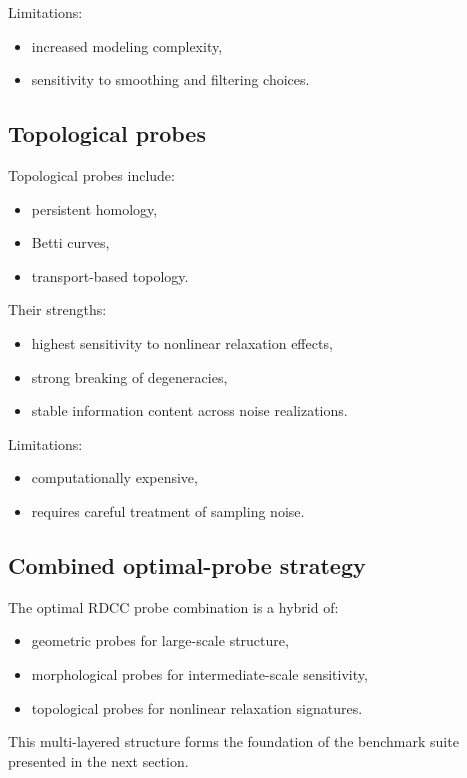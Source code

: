 \documentclass[11pt,a4paper]{article}
\begin{document}
Limitations:
\begin{itemize}
    \item increased modeling complexity,
    \item sensitivity to smoothing and filtering choices.
\end{itemize}

\subsection{Topological probes}

Topological probes include:
\begin{itemize}
    \item persistent homology,
    \item Betti curves,
    \item transport-based topology.
\end{itemize}

Their strengths:
\begin{itemize}
    \item highest sensitivity to nonlinear relaxation effects,
    \item strong breaking of degeneracies,
    \item stable information content across noise realizations.
\end{itemize}

Limitations:
\begin{itemize}
    \item computationally expensive,
    \item requires careful treatment of sampling noise.
\end{itemize}

\subsection{Combined optimal-probe strategy}

The optimal RDCC probe combination is a hybrid of:
\begin{itemize}
    \item geometric probes for large-scale structure,
    \item morphological probes for intermediate-scale sensitivity,
    \item topological probes for nonlinear relaxation signatures.
\end{itemize}

This multi-layered structure forms the foundation of the benchmark suite 
presented in the next section.
\end{document}
